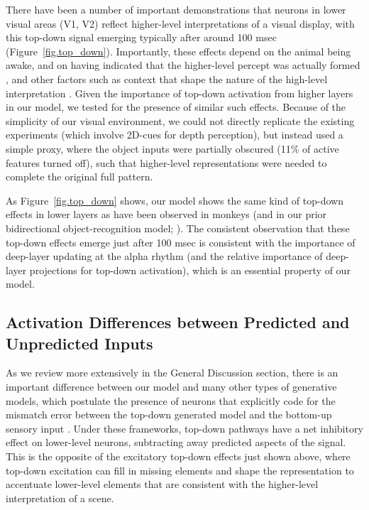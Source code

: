 \documentclass[11pt,twoside]{article}
\newif\myifpdf
\begin{document}
There have been a number of important demonstrations that neurons in lower visual areas (V1, V2) reflect higher-level interpretations of a visual display, with this top-down signal emerging typically after around 100 msec \cite{SuperSpekreijseLamme01,FahrenfortScholteLamme08,LeeNguyen01,LeeYangRomeroEtAl02} (Figure~\ref{fig.top_down}).  Importantly, these effects depend on the animal being awake, and on having indicated that the higher-level percept was actually formed \cite{SuperSpekreijseLamme01}, and other factors such as context that shape the nature of the high-level interpretation \cite{LeeMumford03}.  Given the importance of top-down activation from higher layers in our model, we tested for the presence of similar such effects.  Because of the simplicity of our visual environment, we could not directly replicate the existing experiments (which involve 2D-cues for depth perception), but instead used a simple proxy, where the object inputs were partially obscured (11\% of active features turned off), such that higher-level representations were needed to complete the original full pattern.

As Figure~\ref{fig.top_down} shows, our model shows the same kind of top-down effects in lower layers as have been observed in monkeys (and in our prior bidirectional object-recognition model; ).  The consistent observation that these top-down effects emerge just after 100 msec is consistent with the importance of deep-layer updating at the alpha rhythm (and the relative importance of deep-layer projections for top-down activation), which is an essential property of our model.


\subsection{Activation Differences between Predicted and Unpredicted Inputs}

As we review more extensively in the General Discussion section, there is an important difference between our model and many other types of generative models, which postulate the presence of neurons that explicitly code for the mismatch error between the top-down generated model and the bottom-up sensory input \cite{Mumford92,RaoBallard99,KawatoHayakawaInui93,Friston05}.  Under these frameworks, top-down pathways have a net inhibitory effect on lower-level neurons, subtracting away predicted aspects of the signal.  This is the opposite of the excitatory top-down effects just shown above, where top-down excitation can fill in missing elements and shape the representation to accentuate lower-level elements that are consistent with the higher-level interpretation of a scene.
\end{document}
